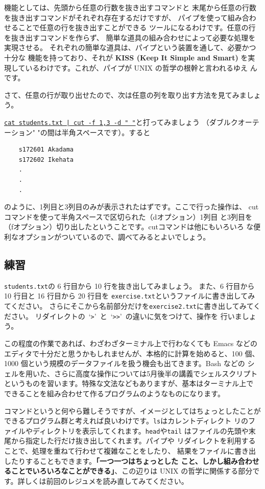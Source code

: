 \documentclass[a4j]{ltjsreport}
\begin{document}
    機能としては、先頭から任意の行数を抜き出すコマンドと
    末尾から任意の行数を抜き出すコマンドがそれぞれ存在するだけですが、
    パイプを使って組み合わせることで任意の行を抜き出すことができる
    ツールになるわけです。任意の行を抜き出すコマンドを作らず、
    簡単な道具の組み合わせによって必要な処理を実現させる。
    それぞれの簡単な道具は、パイプという装置を通して、必要かつ十分な
    機能を持っており、それが \textbf{KISS (Keep It Simple and Smart)} 
    を実現しているわけです。これが、パイプが UNIX の哲学の根幹と言われるゆえ
    んです。

    さて、任意の行が取り出せたので、次は任意の列を取り出す方法を見てみましょう。

    \underline{\texttt{cat students.txt | cut -f 1,3 -d " "}}と打ってみましょう
    （ダブルクオーテーション" "の間は半角スペースです）。すると
    \begin{verbatim}
    s172601 Akadama
    s172602 Ikehata
    .                                                
    .
    .
    \end{verbatim}
    のように、1列目と3列目のみが表示されたはずです。ここで行った操作は、
    cutコマンドを使って半角スペースで区切られた（dオプション）1列目
    と3列目を（fオプション）切り出したということです。cutコマンドは他にもいろいろ
    な便利なオプションがついているので、調べてみるとよいでしょう。
    \subsection{練習}
    \verb+students.txt+の 6 行目から 10 行を抜き出してみましょう。
    また、6 行目から 10 行目と 16 行目から 20 行目を
    \verb+exercise.txt+というファイルに書き出してみてください。
    さらにそこから名前部分だけを\verb+exercise2.txt+に書き出してみてください。
    リダイレクトの~`\verb+>+'~と~`\verb+>>+'~の違いに気をつけて、操作を
    行いましょう。

    この程度の作業であれば、わざわざターミナル上で行わなくても Emacs などの
    エディタで十分だと思うかもしれませんが、本格的に計算を始めると、100 個、
    1000 個という規模のデータファイルを扱う機会も出てきます。Bash などの
    シェルを用いた、さらに高度な操作については5月後半の講義でシェルスクリプト
    というものを習います。特殊な文法などもありますが、基本はターミナル上で
    できることを組み合わせて作るプログラムのようなものになります。

    \vspace*{3mm}

    コマンドというと何やら難しそうですが、イメージとしてはちょっとしたことが
    できるプログラム群と考えれば良いわけです。\verb+ls+はカレントディレクト
    リのファイルやディレクトリを表示してくれます。\verb+head+や\verb+tail+
    はファイルの先頭や末尾から指定した行だけ抜き出してくれます。パイプや
    リダイレクトを利用することで、処理を重ねて行わせて複雑なことをしたり、
    結果をファイルに書き出したりすることもできます。\textbf{「一つ一つはちょっとした
    こと、しかし組み合わせることでいろいろなことができる」}、この辺りは UNIX
    の哲学に関係する部分です。詳しくは前回のレジュメを読み直してみてください。
\end{document}
